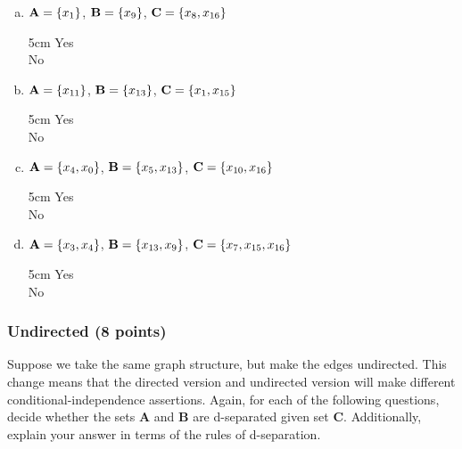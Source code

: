 \documentclass[11pt]{article}
\newcommand{\Unchecked}{{\LARGE \Square}}%
\newcommand{\answertextheight}{5cm}
\begin{document}
\begin{enumerate}[(a)]
\item {${\bf A} = \{x_1\}$, ${\bf B} = \{x_9\}$, ${\bf C} = \{x_8,x_{16}\}$}

\begin{answertext}{\answertextheight}{}
  \Unchecked Yes\\
  \Unchecked No

\end{answertext}

\item {${\bf A} = \{x_{11}\}$, ${\bf B} = \{x_{13}\}$, ${\bf C} = \{x_1,x_{15}\}$}

\begin{answertext}{\answertextheight}{}
  \Unchecked Yes\\
  \Unchecked No

\end{answertext}


\item ${\bf A} = \{x_4, x_0\}$, ${\bf B} = \{x_5, x_{13}\}$, ${\bf C} = \{x_{10},x_{16}\}$

\begin{answertext}{\answertextheight}{}
  \Unchecked Yes\\
  \Unchecked No

\end{answertext}


\item ${\bf A} = \{x_3, x_4\}$, ${\bf B} = \{x_{13},x_9\}$, ${\bf C} = \{x_7,x_{15},x_{16}\}$

\begin{answertext}{\answertextheight}{}
  \Unchecked Yes\\
  \Unchecked No

\end{answertext}


\end{enumerate}

\newpage
\subsubsection{Undirected (8 points)}
Suppose we take the same graph structure, but make the edges undirected.  This
change means that the directed version and undirected version will make
different conditional-independence assertions.  Again, for each of the following
questions, decide whether the sets \textbf{A} and \textbf{B} are d-separated
given set \textbf{C}. Additionally, explain your answer in terms of the rules of d-separation. 
\end{document}
